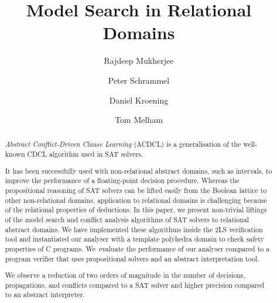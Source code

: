 \documentclass[a4paper]{llncs}
\newcommand{\Omit}[1]{}
\begin{document}
\title{Model Search in Relational Domains}

\author{Rajdeep Mukherjee \and Peter Schrammel \and
Daniel Kroening \and Tom Melham}


\maketitle

\begin{abstract}
%
\emph{Abstract Conflict-Driven Clause Learning} (ACDCL) is a generalisation
of the well-known CDCL algorithm used in SAT solvers.
%
\Omit {  ACDCL alternates between a model search, which
performs over-approximate deduction with constraint propagation, and a
conflict analysis, which performs under-approximate abduction with heuristic
choice.
}
%
It has been successfully used with non-relational abstract domains, such
as intervals, to improve the performance of a floating-point decision
procedure.  Whereas the propositional reasoning of SAT 
solvers can be lifted easily from the Boolean lattice to other 
non-relational domains, application to relational domains is 
challenging because of the relational properties of deductions.
%
In this paper, we present non-trivial liftings of the model search and
conflict analysis algorithms of SAT solvers to relational abstract domains.  We have
implemented these algorithms inside the 2LS verification tool and
instantiated our analyser with a template polyhedra domain to check safety
properties of C programs.  We~evaluate the performance of our analyser 
compared to a program verifier that uses propositional solvers and
an abstract interpretation tool.
%
\Omit {
on a set of benchmarks drawn from bit-vector regression 
in SV-COMP'16, bit-precise software models of hardware 
circuits auto-generated from v2c tool, and several 
bounds checking benchmarks 
}
We observe a reduction of two orders of magnitude in the number of 
decisions, propagations, and conflicts compared to a SAT 
solver and higher precision compared to an abstract interpreter. 
\Omit{
along with stronger deductions and learnt clauses aided by the richer
abstract domains.
}
%
\end{abstract}
\end{document}
